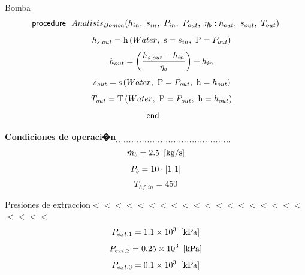 \documentclass[10pt,fleqn]{article}
\theoremstyle{mytheoremstyle}
\theoremstyle{mytheoremstyle}
\theoremstyle{myproblemstyle}
\newcommand{\F}[1]{\mbox{$#1$}}
\newcommand{\K}[1]{\mbox{\sf#1\ \ \mit}}
\newcommand{\I}{\mbox{\hspace{0.20in}}}
\newcommand{\temperature}{\mathrm{T}}
\newcommand{\enthalpy}{\mathrm{h}}
\newcommand{\entropy}{\mathrm{s}}
\begin{document}
\vspace{0.10in}
\noindent
\vspace{0.1 in}
{\color{blue} \rm Bomba}
\begin{equation}
\label{EES Eqn:7}
\K{procedure} \F{Analisis_{Bomba}}{ \left( h_{in},\ s_{in},\ P_{in},\ P_{out},\ \eta_{b}:h_{out},\ s_{out},\ T_{out} \right) } 
\end{equation}
\begin{equation}
\I \label{EES Eqn:8}
h_{s,out} = \enthalpy \left(\F{Water},\mbox{\ s}=s_{in},\mbox{\ P}=P_{out} \right)  
\end{equation}
\begin{equation}
\I \label{EES Eqn:9}
h_{out} =  \left( \frac {h_{s,out}-h_{in}}{ \eta_{b} } \right) +h_{in} 
\end{equation}
\begin{equation}
\I \label{EES Eqn:10}
s_{out} = \entropy \left(\F{Water},\mbox{\ P}=P_{out},\mbox{\ h}=h_{out} \right)  
\end{equation}
\begin{equation}
\I \label{EES Eqn:11}
T_{out} = \temperature \left(\F{Water},\mbox{\ P}=P_{out},\mbox{\ h}=h_{out} \right)  
\end{equation}
\begin{equation}
\label{EES Eqn:12}
\K{end} 
\end{equation}

\vspace{0.10in}
\noindent
\vspace{0.1 in}
{\color{red} \bf Condiciones de operaci�n$_{,,,,,,,,,,,,,,,,,,,,,,,,,,,,,,,,,,,,,,,,,,,,}$}
\begin{equation}
\label{EES Eqn:13}
\dot {m}_{b} = 2.5  \   \left[ \rm kg/s \right] 
\end{equation}
{\color{blue} \rm}
\begin{equation}
\label{EES Eqn:14}
P_{b} = 10\cdot \rm { \left|1\ {\rm1} \right|} 
\end{equation}
\begin{equation}
\label{EES Eqn:15}
T_{hf,in} = 450 
\end{equation}

\vspace{0.10in}
\noindent
{\color{blue} \rm Presiones de  extraccion$<$$<$$<$$<$$<$$<$$<$$<$$<$$<$$<$$<$$<$$<$$<$$<$$<$$<$$<$$<$$<$$<$$<$}
\begin{equation}
\label{EES Eqn:16}
P_{ext,1} = 1.1\times 10^{3}  \   \left[ \rm kPa \right] 
\end{equation}
{\color{blue} \rm}
\begin{equation}
\label{EES Eqn:17}
P_{ext,2} = 0.25\times 10^{3}  \   \left[ \rm kPa \right] 
\end{equation}
{\color{blue} \rm}
\begin{equation}
\label{EES Eqn:18}
P_{ext,3} = 0.1\times 10^{3}  \   \left[ \rm kPa \right] 
\end{equation}
{\color{blue} \rm}
\end{document}

